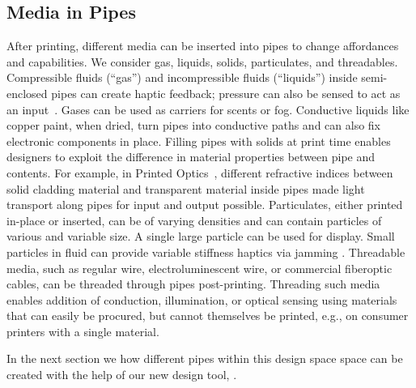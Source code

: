 \subsection{Media in Pipes}
After printing, different media can be inserted into pipes to change affordances and capabilities. We consider gas, liquids, solids, particulates, and threadables. 
%
Compressible fluids (``gas'') and incompressible fluids (``liquids'')  inside semi-enclosed pipes can create haptic feedback; pressure can also be sensed to act as an input~\cite{Slyper-shape}. Gases can be used as carriers for scents or fog. Conductive liquids like copper paint, when dried, turn pipes into conductive paths and can also fix electronic components in place.
%
Filling pipes with solids at print time enables designers to exploit the difference in material properties between pipe and contents. For example, in Printed Optics~\cite{Willis-printedoptics}, different refractive indices between solid cladding material and transparent material inside pipes made light transport along pipes for input and output possible.
%
Particulates, either printed in-place or inserted, can be of varying densities and can contain particles of various and variable size.  A single large particle can be used for display.  Small particles in fluid can provide variable stiffness haptics via jamming \cite{Follmer-jamming}. 
%
Threadable media, such as regular wire, electroluminescent wire, or commercial fiberoptic cables, can be threaded through pipes post-printing. Threading such media enables addition of conduction, illumination, or optical sensing using materials that can easily be procured, but cannot themselves be printed, e.g., on consumer printers with a single material. 

In the next section we how different pipes within this design space space can be created with the help of our new design tool, \systemname.
